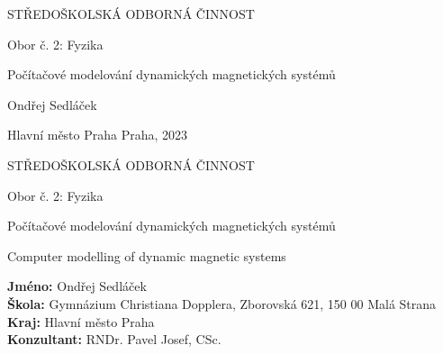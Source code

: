 \documentclass[12pt, a4paper,
 twoside,        %
 openright
]{report}
\title{\mainTitle} %
\author{\authorName} %
\date{\publicationYear} %
\newcommand\city{Praha} %
\newcommand\district{Hlavní město Praha} %
\newcommand\specialization{Obor č. 2: Fyzika} %
\newcommand\school{Gymnázium Christiana Dopplera} %
\newcommand\schoolAddress{Zborovská 621, 150 00 Malá Strana} %
\newcommand\consultant{RNDr. Pavel Josef, CSc.} %
\newcommand\authorName{Ondřej Sedláček}  %
\newcommand\publicationYear{2023} %
\newcommand\mainTitle{Počítačové modelování dynamických magnetických systémů} %
\newcommand\mainTitleEN{Computer modelling of dynamic magnetic systems} %
\begin{document}
\pagestyle{empty}
\graphicspath{{./imgsLR}}

\begin{titlepage}
    \bfseries{ %
        \begin{center}
            \LARGE{STŘEDOŠKOLSKÁ ODBORNÁ ČINNOST}

            \vspace{14pt}
            \large{ %
                \specialization
            } %

            \vspace{0.3 \textheight}

            \LARGE{ %
                \mainTitle
            }%

            \vspace{0.35 \textheight}
        \end{center}

        \noindent\Large{\authorName}

        \noindent\Large{\district {}  \city, \publicationYear}


    } %
\end{titlepage}
\cleardoublepage

{\bfseries %
    \begin{center}
        \LARGE{STŘEDOŠKOLSKÁ ODBORNÁ ČINNOST}

        \vspace{14pt}
        {\large %
            \specialization %
        } %

        \vspace{0.20 \textheight}

        \LARGE{ %
            \mainTitle
        }

        \LARGE{ %
            \mainTitleEN
        }%

        \vspace{0.25\textheight}
    \end{center}
}%
{\Large %
    \noindent\textbf{Jméno:} \authorName\\
    \textbf{Škola:} \school, \schoolAddress\\
    \textbf{Kraj:} \district\\
    \textbf{Konzultant:} \consultant\\
} %
\end{document}
